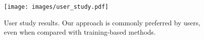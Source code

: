 

\begin{figure}
    \centering
    \texttt{[image: images/user\_study.pdf]}
    \caption{User study results. Our approach is commonly preferred by users, even when compared with training-based methods.}\label{fig:user_study}
\end{figure}
